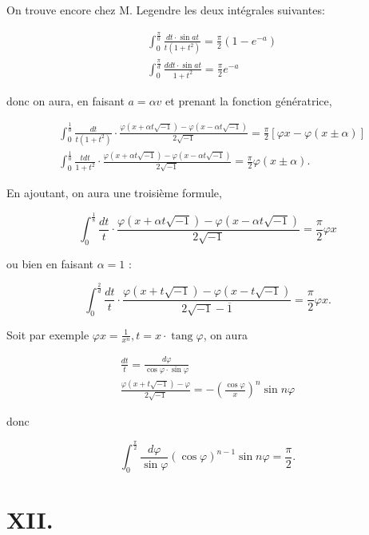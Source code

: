 \documentclass{article}
\begin{document}
On trouve encore chez M. Legendre les deux intégrales suivantes:

\[
\begin{aligned}
& \int_{0}^{\frac{\pi}{0}} \frac{d t \cdot \sin a t}{t\left(1+t^{2}\right)}=\frac{\pi}{2}\left(1-e^{-a}\right) \\
& \int_{0}^{\frac{\pi}{d}} \frac{d d t \cdot \sin a t}{1+t^{2}}=\frac{\pi}{2} e^{-a}
\end{aligned}
\]

donc on aura, en faisant \(a=\alpha v\) et prenant la fonction génératrice,

\[
\begin{aligned}
& \int_{0}^{\frac{1}{0}} \frac{d t}{t\left(1+t^{2}\right)} \cdot \frac{\varphi(x+\alpha t \sqrt{-1})-\varphi(x-\alpha t \sqrt{-1})}{2 \sqrt{-1}}=\frac{\pi}{2}[\varphi x-\varphi(x \pm \alpha)] \\
& \int_{0}^{\frac{1}{0}} \frac{t d t}{1+t^{2}} \cdot \frac{\varphi(x+\alpha t \sqrt{-1})-\varphi(x-\alpha t \sqrt{-1})}{2 \sqrt{-1}}=\frac{\pi}{2} \varphi(x \pm \alpha) .
\end{aligned}
\]

En ajoutant, on aura une troisième formule,

\[
\int_{0}^{\frac{1}{8}} \frac{d t}{t} \cdot \frac{\varphi(x+\alpha t \sqrt{-1})-\varphi(x-\alpha t \sqrt{-1})}{2 \sqrt{-1}}=\frac{\pi}{2} \varphi x
\]

ou bien en faisant \(\alpha=1\) :

\[
\int_{0}^{\frac{2}{d}} \frac{d t}{t} \cdot \frac{\varphi(x+t \sqrt{-1})-\varphi(x-t \sqrt{-1})}{2 \sqrt{-1}-\overline{1}}=\frac{\pi}{2} \varphi x .
\]

Soit par exemple \(\varphi x=\frac{1}{x^{n}}, t=x \cdot \operatorname{tang} \varphi\), on aura

\[
\begin{gathered}
\frac{d t}{t}=\frac{d \varphi}{\cos \varphi \cdot \sin \varphi} \\
\frac{\varphi(x+t \sqrt{-1})-\varphi}{2 \sqrt{-1}}=-\left(\frac{\cos \varphi}{x}\right)^{n} \sin n \varphi
\end{gathered}
\]

donc

\[
\int_{0}^{\frac{\pi}{2}} \frac{d \varphi}{\sin \varphi}(\cos \varphi)^{n-1} \sin n \varphi=\frac{\pi}{2} .
\]

\section*{XII.}
\end{document}
